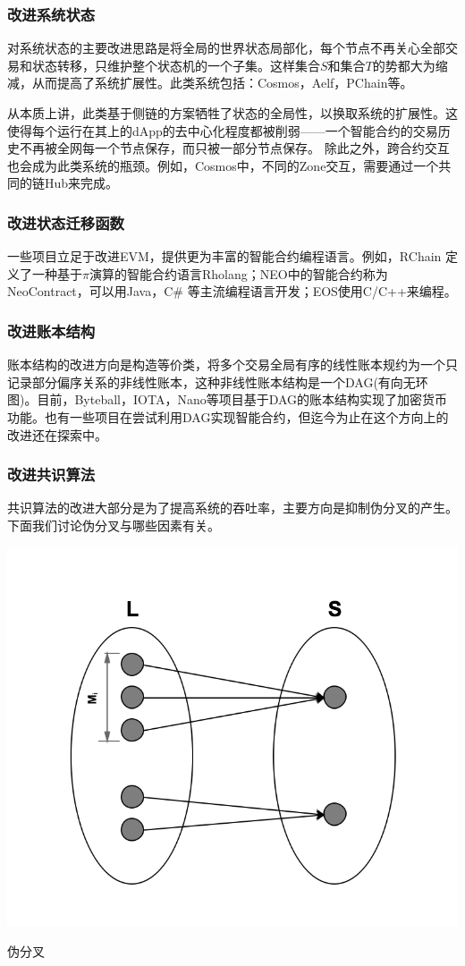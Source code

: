 \documentclass[UTF8,nofonts]{ctexart}
\makeatletter
\newenvironment{figurehere}
 {\def\@captype{figure}}
 {}
\makeatother
\begin{document}
\begin{multicols}{2}
\subsubsection{改进系统状态}
对系统状态的主要改进思路是将全局的世界状态局部化，每个节点不再关心全部交易和状态转移，只维护整个状态机的一个子集。这样集合$S$和集合$T$的势都大为缩减，从而提高了系统扩展性。此类系统包括：Cosmos\cite{cosmos}，Aelf\cite{aelf}，PChain等。

从本质上讲，此类基于侧链的方案牺牲了状态的全局性，以换取系统的扩展性。这使得每个运行在其上的dApp的去中心化程度都被削弱——一个智能合约的交易历史不再被全网每一个节点保存，而只被一部分节点保存。
除此之外，跨合约交互也会成为此类系统的瓶颈。例如，Cosmos中，不同的Zone交互，需要通过一个共同的链Hub来完成\cite{cosmos}。

\subsubsection{改进状态迁移函数}
一些项目立足于改进EVM，提供更为丰富的智能合约编程语言。例如，RChain	定义了一种基于$\pi$演算的智能合约语言Rholang；NEO中的智能合约称为NeoContract，可以用Java，C\# 等主流编程语言开发；EOS使用C/C++来编程。

\subsubsection{改进账本结构}
账本结构的改进方向是构造等价类，将多个交易全局有序的线性账本规约为一个只记录部分偏序关系的非线性账本，这种非线性账本结构是一个DAG(有向无环图)。目前，Byteball\cite{byteball}，IOTA\cite{iota}，Nano\cite{nano}等项目基于DAG的账本结构实现了加密货币功能。也有一些项目在尝试利用DAG实现智能合约，但迄今为止在这个方向上的改进还在探索中。

\subsubsection{改进共识算法}
共识算法的改进大部分是为了提高系统的吞吐率，主要方向是抑制伪分叉的产生。下面我们讨论伪分叉与哪些因素有关。

\begin{center}
\begin{figurehere}
\includegraphics[width=.7\linewidth]{image/falsefork.png}
\caption{伪分叉}
\end{figurehere}
\end{center}


\end{multicols}
\end{document}
